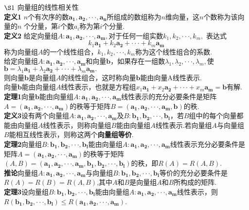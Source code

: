 \documentclass[UTF8]{ctexart}
\date{}
\begin{document}
\thispagestyle{fancy}
\noindent  $\S1$ \quad 向量组的线性相关性
\\ \textbf{定义1} \quad $n$个有次序的数$\bm{a_1},\bm{a_2},\cdot\cdot\cdot,\bm{a_n}$所组成的数组称为$n$维向量，这$n$个数称为该向量的$n$ 个分量，第$i$个数$a_i$称为第$i$个分量.
\\ \textbf{定义2} \quad 给定向量组$A:\bm{a_1},\bm{a_2},\cdot\cdot\cdot,\bm{a_m},$对于任何一组实数$k_1,k_2,\cdot\cdot\cdot,k_m,$ 表达式
$$k_1 \bm{a_1}+k_2\bm{a_2}+\cdot\cdot\cdot+k_m\bm{a_m}$$
称为向量组$A$的一个线性组合，$k_1,k_2,\cdot\cdot\cdot,k_m$称为这个线性组合的系数.
\\ \indent 给定向量组$A:\bm{a_1},\bm{a_2},\cdot\cdot\cdot,\bm{a_m}$和向量$\bm{b}$，如果存在一组数$\lambda_1,\lambda_2,\cdot\cdot\cdot,\lambda_m,$使$\bm{b}=\lambda_1\bm{a_1}+\lambda_2\bm{a_2}+\cdot\cdot\cdot+\lambda_m\bm{a_m}.$
\\ 则向量$\bm{b}$是向量组$A$的线性组合，这时称向量$\bm{b}$能由向量A线性表示.
\\ \indent 向量$\bm{b}$能由向量组$A$线性表示，也就是方程组$x_1\bm{a_1}+x_2\bm{a_2}+\cdot\cdot\cdot+x_m\bm{a_m}=\bm{b}$有解.
\\ \textbf{定理1}\quad 向量$\bm{b}$能由向量组$A:\bm{a_1},\bm{a_2},\cdot\cdot\cdot,\bm{a_m}$线性表示的充分必要条件是矩阵$A=(\bm{a_1},\bm{a_2},\cdot\cdot\cdot,\bm{a_m})$的秩等于矩阵$B=(\bm{a_1},\bm{a_2},\cdot\cdot\cdot,\bm{a_m},\bm{b})$的秩.
\\ \textbf{定义3}\quad 设有两个向量组$A:\bm{a_1},\bm{a_2},\cdot\cdot\cdot,\bm{a_m}$及$B:\bm{b_1},\bm{b_2},\cdot\cdot\cdot,\bm{b_l}$，若$B$组中的每个向量都能由向量组$A$线性表示，则称向量组$B$能由向量组$A$线性表示.若向量组$A$与向量组$B$能相互线性表示，则称这两个\textbf{向量组等价}.
\\ \textbf{定理2}\quad 向量组$B:\bm{b_1},\bm{b_2},\cdot\cdot\cdot,\bm{b_l}$能由向量组$A:\bm{a_1},\bm{a_2},\cdot\cdot\cdot,\bm{a_m}$线性表示充分必要条件是矩阵$A=(\bm{a_1},\bm{a_2},\cdot\cdot\cdot,\bm{a_m})$的秩等于矩阵$(A,B)=(\bm{a_1},\bm{a_2},\cdot\cdot\cdot,\bm{a_m},\bm{b_1},\bm{b_2},\cdot\cdot\cdot,\bm{b_l})$的秩，即$R(A)=R(A,B)$.
\\ \textbf{推论}\quad 向量组$A:\bm{a_1},\bm{a_2},\cdot\cdot\cdot,\bm{a_m}$与向量组$B:\bm{b_1},\bm{b_2},\cdot\cdot\cdot,\bm{b_l}$等价的充分必要条件是$R(A)=R(B)=R(A,B)$,其中$A$和$B$是向量组$A$和$B$所构成的矩阵.
\\ \textbf{定理3}\quad 设向量组$B:\bm{b_1},\bm{b_2},\cdot\cdot\cdot,\bm{b_l}$能由向量组$A:\bm{a_1},\bm{a_2},\cdot\cdot\cdot,\bm{a_m}$线性表示，则$R(\bm{b_1},\bm{b_2},\cdot\cdot\cdot,\bm{b_l})\leq R(\bm{a_1},\bm{a_2},\cdot\cdot\cdot,\bm{a_m})$.
\end{document}
